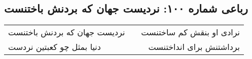 \begin{center}
\section*{رباعی شماره ۱۰۰: نردیست جهان که بردنش باختنست}
\label{sec:sh100}
\begin{longtable}{l p{0.5cm} r}
نردیست جهان که بردنش باختنست
&&
نرادی او بنقش کم ساختنست
\\
دنیا بمثل چو کعبتین نردست
&&
برداشتنش برای انداختنست
\\
\end{longtable}
\end{center}
